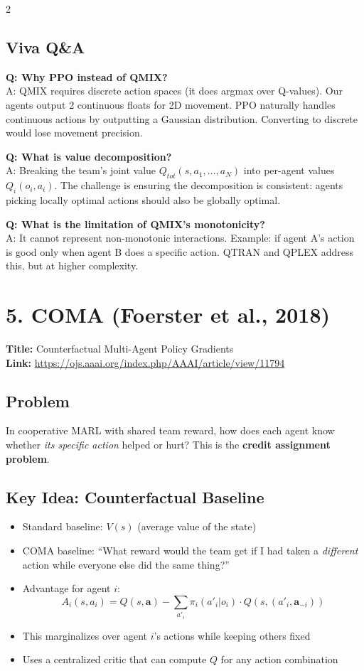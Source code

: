 \documentclass[10pt,a4paper]{article}
\begin{document}
\begin{multicols}{2}
\subsection{Viva Q\&A}

\textbf{Q: Why PPO instead of QMIX?} \\
A: QMIX requires discrete action spaces (it does argmax over Q-values). Our agents output 2 continuous floats for 2D movement. PPO naturally handles continuous actions by outputting a Gaussian distribution. Converting to discrete would lose movement precision.

\textbf{Q: What is value decomposition?} \\
A: Breaking the team's joint value $Q_{tot}(s, a_1, \ldots, a_N)$ into per-agent values $Q_i(o_i, a_i)$. The challenge is ensuring the decomposition is consistent: agents picking locally optimal actions should also be globally optimal.

\textbf{Q: What is the limitation of QMIX's monotonicity?} \\
A: It cannot represent non-monotonic interactions. Example: if agent A's action is good only when agent B does a specific action. QTRAN and QPLEX address this, but at higher complexity.

\section{5. COMA (Foerster et al., 2018)}

\textbf{Title:} Counterfactual Multi-Agent Policy Gradients \\
\textbf{Link:} \url{https://ojs.aaai.org/index.php/AAAI/article/view/11794}

\subsection{Problem}
In cooperative MARL with shared team reward, how does each agent know whether \textit{its specific action} helped or hurt? This is the \textbf{credit assignment problem}.

\subsection{Key Idea: Counterfactual Baseline}
\begin{itemize}
\item Standard baseline: $V(s)$ (average value of the state)
\item COMA baseline: ``What reward would the team get if I had taken a \textit{different} action while everyone else did the same thing?''
\item Advantage for agent $i$:
\[
A_i(s, a_i) = Q(s, \mathbf{a}) - \sum_{a'_i} \pi_i(a'_i | o_i) \cdot Q(s, (a'_i, \mathbf{a}_{-i}))
\]
\item This marginalizes over agent $i$'s actions while keeping others fixed
\item Uses a centralized critic that can compute $Q$ for any action combination
\end{itemize}


\end{multicols}
\end{document}
